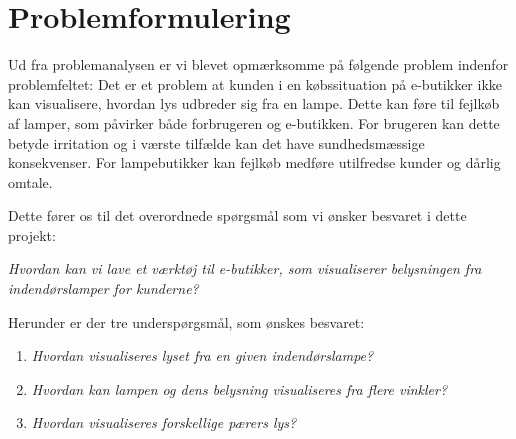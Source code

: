 \section{Problemformulering}
\label{sec:problemformulering}

Ud fra problemanalysen er vi blevet opmærksomme på følgende problem indenfor problemfeltet:
Det er et problem at kunden i en købssituation på e-butikker ikke kan visualisere, hvordan lys udbreder sig fra en lampe. Dette kan føre til fejlkøb af lamper, som påvirker både forbrugeren og e-butikken. For brugeren kan dette betyde irritation og i værste tilfælde kan det have sundhedsmæssige konsekvenser. For lampebutikker kan fejlkøb medføre utilfredse kunder og dårlig omtale. 

Dette fører os til det overordnede spørgsmål som vi ønsker besvaret i dette projekt:

\textit{Hvordan kan vi lave et værktøj til e-butikker, som visualiserer belysningen fra indendørslamper for kunderne?}

Herunder er der tre underspørgsmål, som ønskes besvaret:

\begin{enumerate}

\item \textit{Hvordan visualiseres lyset fra en given indendørslampe?}
\item \textit{Hvordan kan lampen og dens belysning visualiseres fra flere vinkler?}
\item \textit{Hvordan visualiseres forskellige pærers lys?}

\end{enumerate}

\clearpage